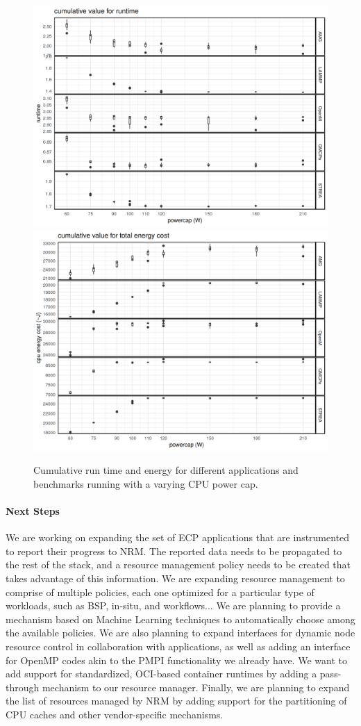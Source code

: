 \begin{figure}
\centering
\includegraphics[width=.45\textwidth]{projects/2.3.1-PMR/2.3.1.19-Argo-PowerSteering/nrm-runtime}
\includegraphics[width=.45\textwidth]{projects/2.3.1-PMR/2.3.1.19-Argo-PowerSteering/nrm-energy}
\caption{Cumulative run time and energy for different applications and
benchmarks running with a varying CPU power cap.}
\label{fig:argo:nrm-results}
\end{figure}

\paragraph{Next Steps}

We are working on expanding the set of ECP applications that are
instrumented to report their progress to NRM.  The reported data needs to
be propagated to the rest of the stack, and a resource management policy
needs to be created that takes advantage of this information.
%
We are expanding resource management to comprise of multiple policies, each
one optimized for a particular type of workloads, such as BSP, in-situ, and
workflows...  We are planning to provide a mechanism based on Machine
Learning techniques to automatically choose among the available policies.
%
We are also planning to expand interfaces for dynamic node resource control
in collaboration with applications, as well as adding an interface for
OpenMP codes akin to the PMPI functionality we already have.
%
We want to add support for standardized, OCI-based container runtimes by
adding a pass-through mechanism to our resource manager.
%
Finally, we are planning to expand the list of resources managed by NRM by
adding support for the partitioning of CPU caches and other vendor-specific
mechanisms.
